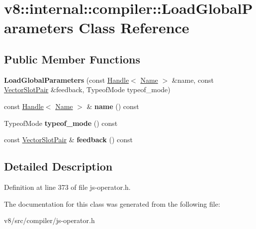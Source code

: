 \hypertarget{classv8_1_1internal_1_1compiler_1_1LoadGlobalParameters}{}\section{v8\+:\+:internal\+:\+:compiler\+:\+:Load\+Global\+Parameters Class Reference}
\label{classv8_1_1internal_1_1compiler_1_1LoadGlobalParameters}
\subsection*{Public Member Functions}
\begin{DoxyCompactItemize}
\item 
\mbox{\label{classv8_1_1internal_1_1compiler_1_1LoadGlobalParameters_aac66f943479ee2e5aa460e94b8cca7a5}} 
{\bfseries Load\+Global\+Parameters} (const \mbox{\hyperlink{classv8_1_1internal_1_1Handle}{Handle}}$<$ \mbox{\hyperlink{classv8_1_1internal_1_1Name}{Name}} $>$ \&name, const \mbox{\hyperlink{classv8_1_1internal_1_1VectorSlotPair}{Vector\+Slot\+Pair}} \&feedback, Typeof\+Mode typeof\+\_\+mode)
\item 
\mbox{\label{classv8_1_1internal_1_1compiler_1_1LoadGlobalParameters_a92f99db4d78e49bc10fb53a48fac292b}} 
const \mbox{\hyperlink{classv8_1_1internal_1_1Handle}{Handle}}$<$ \mbox{\hyperlink{classv8_1_1internal_1_1Name}{Name}} $>$ \& {\bfseries name} () const
\item 
\mbox{\label{classv8_1_1internal_1_1compiler_1_1LoadGlobalParameters_a28219d7ca208e688c8af13c34abea115}} 
Typeof\+Mode {\bfseries typeof\+\_\+mode} () const
\item 
\mbox{\label{classv8_1_1internal_1_1compiler_1_1LoadGlobalParameters_a0ddaaa63a52b8161b76e24d73d41ef0d}} 
const \mbox{\hyperlink{classv8_1_1internal_1_1VectorSlotPair}{Vector\+Slot\+Pair}} \& {\bfseries feedback} () const
\end{DoxyCompactItemize}


\subsection{Detailed Description}


Definition at line 373 of file js-\/operator.\+h.



The documentation for this class was generated from the following file\+:\begin{DoxyCompactItemize}
\item 
v8/src/compiler/js-\/operator.\+h\end{DoxyCompactItemize}
